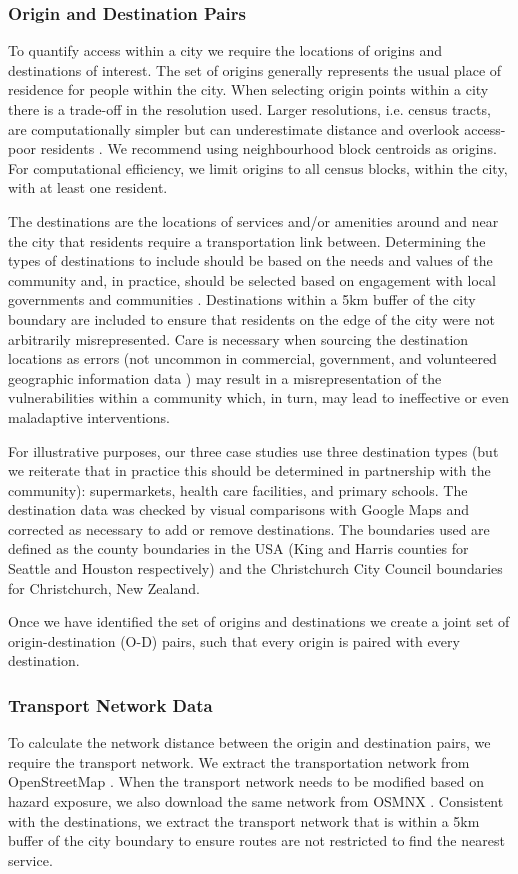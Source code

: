 \documentclass[review,3p,times,onecolumn,sort&compress,12pt]{elsarticle}
\let \cite \parencite
\begin{document}
\subsubsection{Origin and Destination Pairs}
To quantify access within a city we require the locations of origins and destinations of interest.
The set of origins generally represents the usual place of residence for people within the city.
When selecting origin points within a city there is a trade-off in the resolution used. 
Larger resolutions, i.e. census tracts, are computationally simpler but can underestimate distance and overlook access-poor residents \cite{logan2019evaluating}. 
We recommend using neighbourhood block centroids as origins. 
For computational efficiency, we limit origins to all census blocks, within the city, with at least one resident.

The destinations are the locations of services and/or amenities around and near the city that residents require a transportation link between.
Determining the types of destinations to include should be based on the needs and values of the community and, in practice, should be selected based on engagement with local governments and communities \cite{Simonsen2012-bj}.
Destinations within a 5km buffer of the city boundary are included to ensure that residents on the edge of the city were not arbitrarily misrepresented.
Care is necessary when sourcing the destination locations as errors (not uncommon in commercial, government, and volunteered geographic information data \cite{Wong2017-it}) may result in a misrepresentation of the vulnerabilities within a community which, in turn, may lead to ineffective or even maladaptive interventions. 

For illustrative purposes, our three case studies use three destination types (but we reiterate that in practice this should be determined in partnership with the community): supermarkets, health care facilities, and primary schools.
The destination data was checked by visual comparisons with Google Maps and corrected as necessary to add or remove destinations.
The boundaries used are defined as the county boundaries in the USA (King and Harris counties for Seattle and Houston respectively) and the Christchurch City Council boundaries for Christchurch, New Zealand.

Once we have identified the set of origins and destinations we create a joint set of origin-destination (O-D) pairs, such that every origin is paired with every destination.

\subsubsection{Transport Network Data}
To calculate the network distance between the origin and destination pairs, we require the transport network.
We extract the transportation network from OpenStreetMap \cite{OpenStreetMap}.
When the transport network needs to be modified based on hazard exposure, we also download the same network from OSMNX \cite{Boeing2017-nf}. 
Consistent with the destinations, we extract the transport network that is within a 5km buffer of the city boundary to ensure routes are not restricted to find the nearest service.
\end{document}
